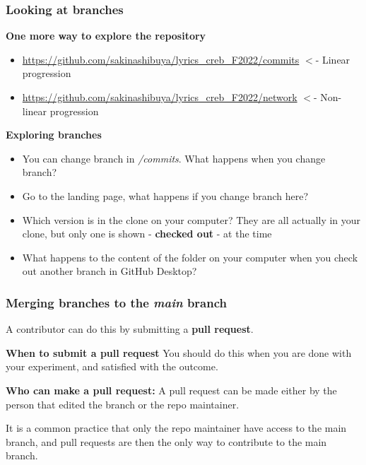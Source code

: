 \documentclass[aspectratio=169]{beamer} %
\newcommand{\trainingURL}[1]{{\color{blue}\url{#1}}}
\newcommand{\traininerUsername}{sakinashibuya}
\newcommand{\repoName}{\traininerUsername/lyrics_creb_F2022}
\newcommand{\trainingRepoURL}[1]{\trainingURL{https://github.com/\repoName #1}}
\begin{document}
\begin{frame}
	\frametitle{Looking at branches}
	
	
	\textbf{One more way to explore the repository}
	\begin{itemize}
		\item \trainingRepoURL{/commits} $<$- Linear progression
		\item \trainingRepoURL{/network} $<$- Non-linear progression
	\end{itemize}
	
	\vspace{.1cm}
	
	\textbf{Exploring branches}
	\begin{itemize}
		\item You can change branch in \textit{/commits}. What happens when you change branch?
		\item Go to the landing page, what happens if you change branch here?
		\item Which version is in the clone on your computer? They are all actually in your clone, but only one is shown - \textbf{checked out} - at the time
		\item What happens to the content of the folder on your computer when you check out another branch in GitHub Desktop?
	\end{itemize}
	
\end{frame}

\begin{frame}
\frametitle{Merging branches to the \textit{main} branch}

	A contributor can do this by submitting a \textbf{pull request}.
	
	\vspace{0.25cm}
	\textbf{When to submit a pull request}	
	You should do this when you are done with your experiment, and satisfied with the outcome.
	
	\vspace{0.25cm}
	\textbf{Who can make a pull request:}
	A pull request can be made either by the person that edited the branch or the repo maintainer.
	
	\vspace{0.25cm}
	
	It is a common practice that only the repo maintainer have access to the main branch, and pull requests are then the only way to contribute to the main branch.


\end{frame}
\end{document}
